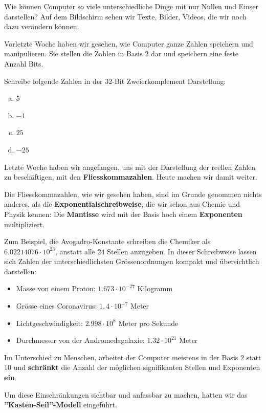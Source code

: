 Wie können Computer so viele unterschiedliche Dinge mit nur Nullen und Einser darstellen? Auf dem Bildschirm sehen wir Texte, Bilder, Videos, die wir noch dazu verändern können.

Vorletzte Woche haben wir gesehen, wie Computer ganze Zahlen speichern und manipulieren. Sie stellen die Zahlen in Basis 2 dar und speichern eine feste Anzahl Bits.

\begin{aufgabe}
Schreibe folgende Zahlen in der 32-Bit Zweierkomplement Darstellung:
\begin{enumerate}[(a)]
\item \(5\)
\item \(-1\)
\item \(25\)
\item \(-25\)
\end{enumerate}
\end{aufgabe}

Letzte Woche haben wir angefangen, uns mit der Darstellung der reellen Zahlen zu beschäftigen, mit den \textbf{Fliesskommazahlen}. Heute machen wir damit weiter.

Die Fliesskommazahlen, wie wir gesehen haben, sind im Grunde genommen nichts anderes, als die \textbf{Exponentialschreibweise}, die wir schon aus Chemie und Physik kennen: Die \textbf{Mantisse} wird mit der Basis hoch einem \textbf{Exponenten} multipliziert.

Zum Beispiel, die Avogadro-Konstante schreiben die Chemiker als \(6.02214076 \cdot 10^{23}\), anstatt alle 24 Stellen anzugeben. In dieser Schreibweise lassen sich Zahlen der unterschiedlichsten Grössenordnungen kompakt und übersichtlich darstellen:
\begin{itemize}
\item Masse von einem Proton: \(1.673 \cdot 10^{-27}\) Kilogramm
\item Grösse eines Coronavirus: \(1,4 \cdot 10^{-7}\) Meter
\item Lichtgeschwindigkeit: \(2.998 \cdot 10^{8}\) Meter pro Sekunde
\item Durchmesser von der Andromedagalaxie: \(1.32 \cdot 10^{21}\) Meter
\end{itemize}

Im Unterschied zu Menschen, arbeitet der Computer meistens in der Basis \(2\) statt \(10\) und \textbf{schränkt} die Anzahl der möglichen signifikanten Stellen und Exponenten \textbf{ein}.

Um diese Einschränkungen sichtbar und anfassbar zu machen, hatten wir das \textbf{''Kasten-Seil''-Modell} eingeführt.

